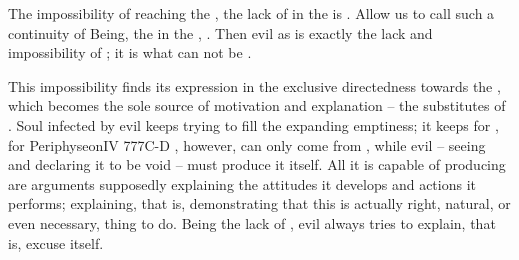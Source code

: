 
\pa\label{pa:noJustification} The impossibility of reaching the ,
the lack of  in the  is
.  Allow us to call such a continuity of Being, the  in the , . Then evil as
 is exactly the lack and impossibility of ; it
is what can not be .

This impossibility finds its expression in the exclusive directedness towards
the , which becomes the sole source of motivation and
explanation -- the substitutes of .  Soul infected by evil
keeps trying to fill the expanding emptiness; it keeps  for
, for \citet{the desire for the bliss, which she had lost,
  remained with her even after the Fall.}{Periphyseon}{IV 777C-D}
, however, can only come from , while evil -- seeing
  and declaring it to be void -- must produce it itself.
All it is capable of producing are arguments supposedly explaining the
attitudes it develops and actions it performs; explaining, that is,
demonstrating that this is actually right, natural, or even necessary, thing to
do.  
Being the lack of , evil always tries to explain, that is,
excuse itself.  

